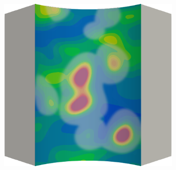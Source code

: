 \begin{frame}
\begin{columns}[T]
\begin{column}{0.6\textwidth}
\begin{figure}
{\begin{subfigure}{0.19\textwidth}
          \end{subfigure}
          \hspace{0.06\textwidth}
          \begin{subfigure}{0.19\textwidth}
            \centering
            \includegraphics[width=\textwidth]{Chapter345/figures/ep.0024}
          \end{subfigure}
        }
        

\end{figure}
\end{column}
\end{columns}
\end{frame}
